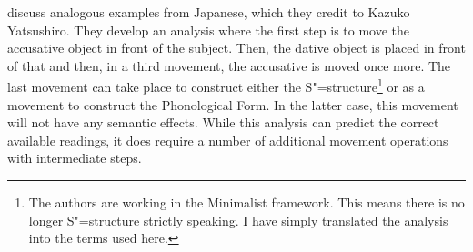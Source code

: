 \citet[]{SE2002a} discuss analogous examples from Japanese, which they credit to Kazuko 
Yatsushiro. They develop an analysis where the first step is to move the accusative object in front of the subject.
Then, the dative object is placed in front of that and then, in a third movement, the accusative is moved once more. The last movement can
take place to construct either the S"=structure\footnote{%
	The authors are working in the Minimalist framework. This means there is no longer S"=structure strictly speaking. I
	have simply translated the analysis into the terms used here.
}
or as a movement to construct the Phonological Form. In the latter case, this movement will not have any semantic effects.
While this analysis can predict the correct available readings, it does require a number of additional movement operations with intermediate steps.

